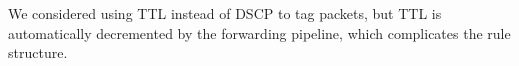 



We considered using TTL instead of DSCP to tag packets, but TTL is automatically 
decremented by the forwarding pipeline, which complicates the rule structure.

